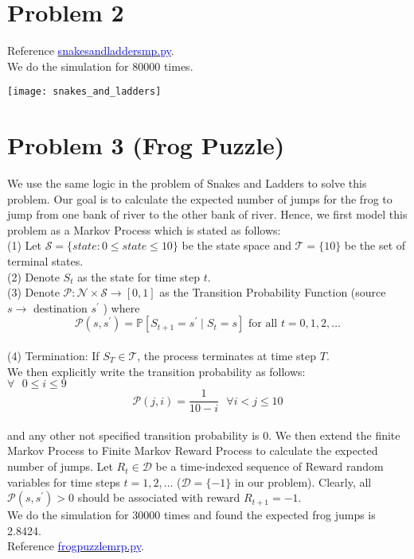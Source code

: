 \documentclass{article}
\begin{document}
\section*{Problem 2}
Reference \href{https://github.com/miaochin/RL-book/tree/master/CME241_assignments/assignment2}{\textcolor{blue}{snakes\textunderscore and\textunderscore ladders\textunderscore mp.py}}.\\
We do the simulation for 80000 times.
\begin{center}
\texttt{[image: snakes\_and\_ladders]}\\
\end{center}
\section*{Problem 3 (Frog Puzzle)}
We use the same logic in the problem of Snakes and Ladders to solve this problem. Our goal is to calculate the expected number of jumps for the frog to jump from one bank of river to the other bank of river. Hence, we first model this problem as a Markov Process which is stated as follows:\\
\hspace*{1em}(1) Let $\mathcal{S}=\{state: 0\leq state \leq 10 \}$ be the state space and $\mathcal{T}=\{10\}$ be the set of terminal states.\\
\hspace*{1em}(2) Denote $S_{t}$ as the state for time step $t$.\\
\hspace*{1em}(3) Denote $\mathcal{P}: \mathcal{N} \times \mathcal{S} \rightarrow[0,1]$ as the Transition Probability Function (source $s \rightarrow$ destination $s^{\prime}$ ) where
$$
\mathcal{P}\left(s, s^{\prime}\right)=\mathbb{P}\left[S_{t+1}=s^{\prime} \mid S_{t}=s\right] \text { for all } t=0,1,2, \ldots
$$\\
\hspace*{1em}(4) Termination: If $S_{T} \in \mathcal{T}$, the process terminates at time step $T$.\\
We then explicitly write the transition probability as follows:\\
\hspace*{1em}$\forall \text{ } 0\leq i\leq 9 $\\

$$
\mathcal{P}\left(j, i\right) = \frac{1}{10-i}\text{ } \forall i<j \leq 10
$$\\
and any other not specified transition probability is 0.
We then extend the finite Markov Process to Finite Markov Reward Process to calculate the expected number of jumps.
Let $R_{t}\in \mathcal{D}$ be a time-indexed sequence of Reward random variables for time steps $t=1,2, \ldots$ ($\mathcal{D}=\{-1\}$ in our problem). Clearly, all $\mathcal{P}\left(s, s^{\prime}\right)> 0$ should be associated with reward $R_{t+1}= -1$.\\
We do the simulation for 30000 times and found the expected frog jumps is 2.8424.\\
Reference \href{https://github.com/miaochin/RL-book/tree/master/CME241_assignments/assignment2}{\textcolor{blue}{frog\textunderscore puzzle\textunderscore mrp.py}}.
\end{document}
